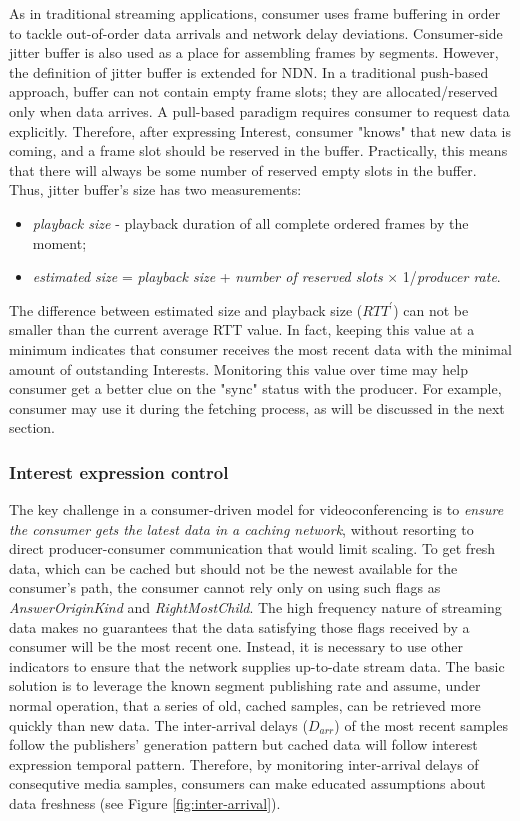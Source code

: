 \documentclass{icn/sig-alternate-2012} %
\begin{document}
As in traditional streaming applications, consumer uses frame buffering in order to tackle out-of-order data arrivals and network delay deviations. Consumer-side jitter buffer is also used as a place for assembling frames by segments. However, the definition of jitter buffer is extended for NDN. In a traditional push-based approach, buffer can not contain empty frame slots; they are allocated/reserved only when data arrives. A pull-based paradigm requires consumer to request data explicitly. Therefore, after expressing Interest, consumer "knows" that new data is coming, and a frame slot should be reserved in the buffer. Practically, this means that there will always be some number of reserved empty slots in the buffer. Thus, jitter buffer's size has two measurements:
\begin{itemize}[label={}]
\item \textit{playback size} - playback duration of all complete ordered frames by the moment;
\item \textit{estimated size} = \textit{playback size} + \textit{number of reserved slots} $\times$ 1/\textit{producer rate}.
\end{itemize}

The difference between estimated size and playback size ($RTT^{\prime}$) can not be smaller than the current average RTT value. In fact, keeping this value at a minimum indicates that consumer receives the most recent data with the minimal amount of outstanding Interests. Monitoring this value over time may help consumer get a better clue on the "sync" status with the producer. For example, consumer may use it during the fetching process, as will be discussed in the next section. 

\subsubsection{Interest expression control}

The key challenge in a consumer-driven model for videoconferencing is to \emph{ensure the consumer gets the latest data in a caching network}, without resorting to direct producer-consumer communication that would limit scaling. To get fresh data, which can be cached but should not be the newest available for the consumer's path,  the consumer cannot rely only on using such flags as \textit{AnswerOriginKind} and \textit{RightMostChild}. The high frequency nature of streaming data makes no guarantees that the data satisfying those flags received by a consumer will be the most recent one. Instead, it is necessary to use other indicators to ensure that the network supplies up-to-date stream data. The basic solution is to leverage the known segment publishing rate and assume, under normal operation, that a series of old, cached samples, can be retrieved more quickly than new data. The inter-arrival delays ($D_{arr}$) of the most recent samples follow the publishers' generation pattern but cached data will follow interest expression temporal pattern. Therefore, by monitoring inter-arrival delays of consequtive media samples, consumers can make educated assumptions about data freshness (see Figure \ref{fig:inter-arrival}).
\end{document}
